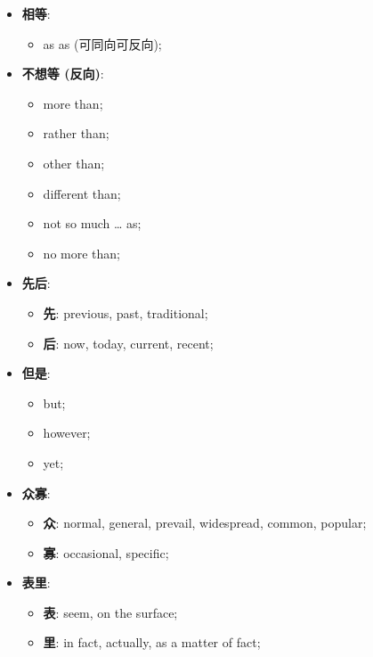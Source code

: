   \begin{multicols}{3}
    \begin{itemize}
      \item \textbf{相等}:
      \begin{itemize}
        \item as as (可同向可反向);
      \end{itemize}

      \item \textbf{不想等 (反向)}:
      \begin{itemize}
        \item more than;
        \item rather than;
        \item other than;
        \item different than;
        \item not so much … as;
        \item no more than;
      \end{itemize}

      \item \textbf{先后}:
      \begin{itemize}
        \item \textbf{先}: previous, past, traditional;
        \item \textbf{后}: now, today, current, recent;
      \end{itemize}

      \item \textbf{但是}:
      \begin{itemize}
        \item but;
        \item however;
        \item yet;
      \end{itemize}

      \item \textbf{众寡}:
      \begin{itemize}
        \item \textbf{众}: normal, general, prevail, widespread, common, popular;
        \item \textbf{寡}: occasional, specific;
      \end{itemize}

      \item \textbf{表里}:
      \begin{itemize}
        \item \textbf{表}: seem, on the surface;
        \item \textbf{里}: in fact, actually, as a matter of fact;
      \end{itemize}


\end{itemize}
\end{multicols}
